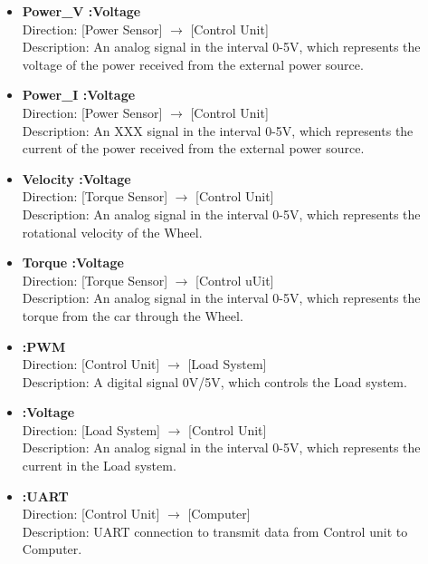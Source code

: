 \begin{itemize}
	\item \textbf{Power\_V :Voltage}\\
		Direction: [Power Sensor] $\rightarrow$ [Control Unit]\\
		Description: An analog signal in the interval 0-5V, which represents the voltage of the power received from the external power source.
	\item \textbf{Power\_I :Voltage}\\
		Direction: [Power Sensor] $\rightarrow$ [Control Unit]\\
		Description: An XXX  signal in the interval 0-5V, which represents the current of the power received from the external power source.
	\item \textbf{Velocity :Voltage}\\
		Direction: [Torque Sensor] $\rightarrow$ [Control Unit]\\
		Description: An analog signal in the interval 0-5V, which represents the rotational velocity of the Wheel.
	\item \textbf{Torque :Voltage}\\
		Direction: [Torque Sensor] $\rightarrow$ [Control uUit]\\
		Description: An analog signal in the interval 0-5V, which represents the torque from the car through the Wheel.
	\item \textbf{:PWM}\\
		Direction: [Control Unit] $\rightarrow$ [Load System]\\
		Description: A digital signal 0V/5V, which controls the Load system.
	\item \textbf{:Voltage}\\
		Direction: [Load System] $\rightarrow$ [Control Unit]\\
		Description: An analog signal in the interval 0-5V, which represents the current in the Load system.
	\item \textbf{:UART}\\
		Direction: [Control Unit] $\rightarrow$ [Computer]\\
		Description: UART connection to transmit data from Control unit to Computer.
\end{itemize}